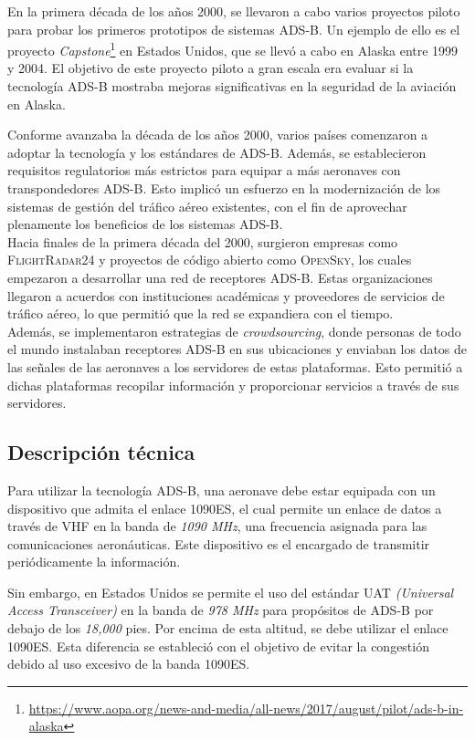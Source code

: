 \documentclass[a4paper, 11pt]{book}
\begin{document}
En la primera década de los años 2000, se llevaron a cabo varios proyectos piloto para probar los primeros prototipos de sistemas \textsc{ADS-B}. Un ejemplo de ello es el proyecto \emph{Capstone}\footnote{\url{https://www.aopa.org/news-and-media/all-news/2017/august/pilot/ads-b-in-alaska}} en Estados Unidos, que se llevó a cabo en Alaska entre 1999 y 2004. El objetivo de este proyecto piloto a gran escala era evaluar si la tecnología \textsc{ADS-B} mostraba mejoras significativas en la seguridad de la aviación en Alaska.

Conforme avanzaba la década de los años 2000, varios países comenzaron a adoptar la tecnología y los estándares de \textsc{ADS-B}. Además, se establecieron requisitos regulatorios más estrictos para equipar a más aeronaves con transpondedores \textsc{ADS-B}. Esto implicó un esfuerzo en la modernización de los sistemas de gestión del tráfico aéreo existentes, con el fin de aprovechar plenamente los beneficios de los sistemas \textsc{ADS-B}.\\
Hacia finales de la primera década del 2000, surgieron empresas como \textsc{FlightRadar24} y proyectos de código abierto como \textsc{OpenSky}, los cuales empezaron a desarrollar una red de receptores \textsc{ADS-B}. Estas organizaciones llegaron a acuerdos con instituciones académicas y proveedores de servicios de tráfico aéreo, lo que permitió que la red se expandiera con el tiempo. \\
Además, se implementaron estrategias de \emph{crowdsourcing}, donde personas de todo el mundo instalaban receptores \textsc{ADS-B} en sus ubicaciones y enviaban los datos de las señales de las aeronaves a los servidores de estas plataformas. Esto permitió a dichas plataformas recopilar información y proporcionar servicios a través de sus servidores.
\subsection{Descripción técnica}
Para utilizar la tecnología \textsc{ADS-B}, una aeronave debe estar equipada con un dispositivo que admita el enlace \textsc{1090ES}, el cual permite un enlace de datos a través de \textsc{VHF} en la banda de \emph{1090 MHz}, una frecuencia asignada para las comunicaciones aeronáuticas. Este dispositivo es el encargado de transmitir periódicamente la información.

Sin embargo, en Estados Unidos se permite el uso del estándar \textsc{UAT} \emph{(Universal Access Transceiver)} en la banda de \emph{978 MHz} para propósitos de \textsc{ADS-B} por debajo de los \emph{18,000} pies. Por encima de esta altitud, se debe utilizar el enlace \textsc{1090ES}. Esta diferencia se estableció con el objetivo de evitar la congestión debido al uso excesivo de la banda \textsc{1090ES}.
\end{document}
